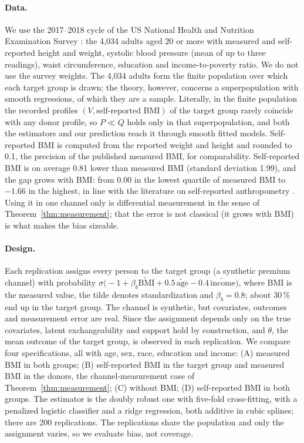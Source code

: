 \paragraph{Data.} We use the 2017--2018 cycle of the US National Health and Nutrition Examination Survey \citep{nchs2020}: the 4{,}034 adults aged 20 or more with measured and self-reported height and weight, systolic blood pressure (mean of up to three readings), waist circumference, education and income-to-poverty ratio. We do not use the survey weights. The 4{,}034 adults form the finite population over which each target group is drawn; the theory, however, concerns a superpopulation with smooth regressions, of which they are a sample. Literally, in the finite population the recorded profiles $(V,\text{self-reported BMI})$ of the target group rarely coincide with any donor profile, so $P\ll Q$ holds only in that superpopulation, and both the estimators and our prediction reach it through smooth fitted models. Self-reported BMI is computed from the reported weight and height and rounded to 0.1, the precision of the published measured BMI, for comparability. Self-reported BMI is on average 0.81 lower than measured BMI (standard deviation 1.99), and the gap grows with BMI: from 0.00 in the lowest quartile of measured BMI to $-1.66$ in the highest, in line with the literature on self-reported anthropometry \citep{connorgorber2007}. Using it in one channel only is differential measurement in the sense of Theorem~\ref{thm:measurement}; that the error is not classical (it grows with BMI) is what makes the bias sizeable.

\paragraph{Design.} Each replication assigns every person to the target group (a synthetic premium channel) with probability $\sigma\bigl(-1+\beta_b \tilde{\mathrm{BMI}}+0.5\,\tilde{\mathrm{age}}-0.4\,\tilde{\mathrm{income}}\bigr)$, where BMI is the measured value, the tilde denotes standardization and $\beta_b=0.8$; about 30\,\% end up in the target group. The channel is synthetic, but covariates, outcomes and measurement error are real. Since the assignment depends only on the true covariates, latent exchangeability and support hold by construction, and $\theta$, the mean outcome of the target group, is observed in each replication. We compare four specifications, all with age, sex, race, education and income: (A) measured BMI in both groups; (B) self-reported BMI in the target group and measured BMI in the donors, the channel-measurement case of Theorem~\ref{thm:measurement}; (C) without BMI; (D) self-reported BMI in both groups. The estimator is the doubly robust one with five-fold cross-fitting, with a penalized logistic classifier and a ridge regression, both additive in cubic splines; there are 200 replications. The replications share the population and only the assignment varies, so we evaluate bias, not coverage.

